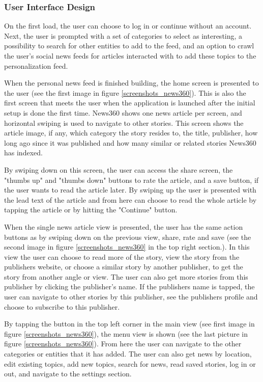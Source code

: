 \subsubsection{User Interface Design}
On the first load, the user can choose to log in or continue without an account. Next, the user is prompted with a set of categories to select as interesting, a possibility to search for other entities to add to the feed, and an option to crawl the user's social news feeds for articles interacted with to add these topics to the personalization feed.

When the personal news feed is finished building, the home screen is presented to the user (see the first image in figure \ref{screenshots_news360}). This is also the first screen that meets the user when the application is launched after the initial setup is done the first time. News360 shows one news article per screen, and horizontal swiping is used to navigate to other stories. This screen shows the article image, if any, which category the story resides to, the title, publisher, how long ago since it was published and how many similar or related stories News360 has indexed.

By swiping down on this screen, the user can access the share screen, the "thumbs up" and "thumbs down" buttons to rate the article, and a save button, if the user wants to read the article later. By swiping up the user is presented with the lead text of the article and from here can choose to read the whole article by tapping the article or by hitting the "Continue" button.

When the single news article view is presented, the user has the same action buttons as by swiping down on the previous view, share, rate and save (see the second image in figure \ref{screenshots_news360} in the top right section.). In this view the user can choose to read more of the story, view the story from the publishers website, or choose a similar story by another publisher, to get the story from another angle or view. The user can also get more stories from this publisher by clicking the publisher's name. If the publishers name is tapped, the user can navigate to other stories by this publisher, see the publishers profile and choose to subscribe to this publisher.

By tapping the button in the top left corner in the main view (see first image in figure \ref{screenshots_news360}), the menu view is shown (see the last picture in figure \ref{screenshots_news360}). From here the user can navigate to the other categories or entities that it has added. The user can also get news by location, edit existing topics, add new topics, search for news, read saved stories, log in or out, and navigate to the settings section.



